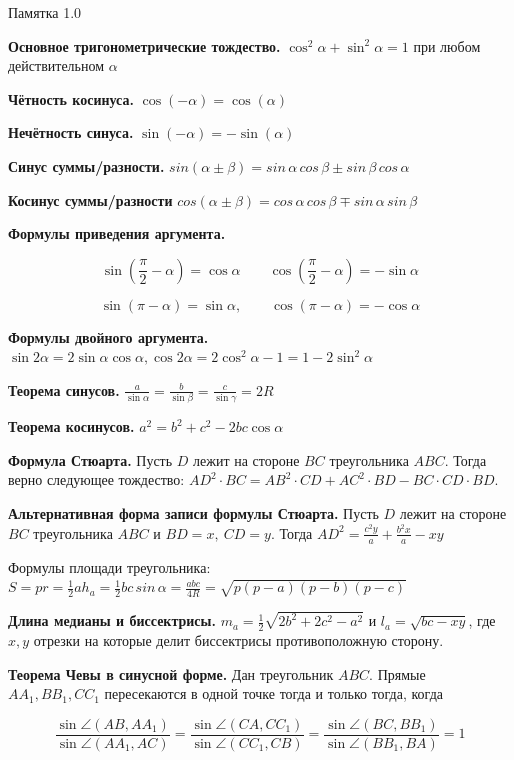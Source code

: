 \centerline{\Huge Памятка 1.0}
\centerline{\Huge }

\textbf{Основное тригонометрические тождество.} $\cos^2\alpha + \sin^2\alpha = 1$ при любом действительном $\alpha$

\textbf{Чётность косинуса.} $\cos(-\alpha) = \cos(\alpha)$

\textbf{Нечётность синуса.} $\sin (-\alpha) = - \sin(\alpha) $
 
\textbf{Синус суммы/разности.} $sin(\alpha \pm \beta) = sin \, \alpha \, cos \, \beta  \pm sin \, \beta \, cos \, \alpha $

\textbf{Косинус суммы/разности} $cos(\alpha \pm \beta) = cos \, \alpha \, cos \, \beta  \mp sin \, \alpha \, sin \, \beta $

\textbf{Формулы приведения аргумента.} 

$$
\sin(\frac{\pi}{2}- \alpha) = \cos \alpha \qquad \cos(\frac{\pi}{2} - \alpha) = -\sin\alpha
$$

$$
\sin(\pi - \alpha) = \sin\alpha, \qquad \cos(\pi - \alpha) = - \cos\alpha
$$

\textbf{Формулы двойного аргумента.} $\sin2\alpha = 2\sin\alpha \cos\alpha, \cos2\alpha = 2\cos^2\alpha - 1 = 1 - 2\sin^2\alpha$

\textbf{Теорема синусов.} $\frac{a}{\sin \alpha} = \frac{b}{\sin \beta} = \frac{c}{\sin \gamma} = 2R$

\textbf{Теорема косинусов.} $a^2 = b^2 + c^2 - 2bc  \cos  \alpha$

\textbf{Формула Стюарта.} Пусть $D$ лежит на стороне $BC$ треугольника $ABC$. Тогда верно следующее тождество: $AD^2 \cdot BC = AB^2 \cdot CD + AC^2 \cdot BD - BC \cdot CD \cdot BD.$ 

\textbf{Альтернативная форма записи формулы Стюарта.} Пусть $D$ лежит на стороне $BC$ треугольника $ABC$ и $BD = x,\ CD = y$. Тогда $AD^2 = \frac{c^2y}{a} + \frac{b^2x}{a} - xy$

Формулы площади треугольника: $S = pr = \frac{1}{2}ah_a = \frac{1}{2}bc \, sin \, \alpha = \frac{abc}{4R} = \sqrt{p(p-a)(p-b)(p-c)}$

\textbf{Длина медианы и биссектрисы.} $m_a = \frac{1}{2}\sqrt{2b^2 + 2c^2 - a^2}$ и $l_a = \sqrt{bc - xy}$, где $x, y$ отрезки на которые делит биссектрисы противоположную сторону.

\textbf{Теорема Чевы в синусной форме.} Дан треугольник $ABC$. Прямые $AA_1, BB_1, CC_1$ пересекаются в одной точке тогда и только тогда, когда

$$
	\frac{\sin \angle(AB, AA_1)}{\sin \angle(AA_1, AC)} = 
	\frac{\sin \angle(CA, CC_1)}{\sin \angle(CC_1, CB)} =
	\frac{\sin \angle(BC, BB_1)}{\sin \angle(BB_1, BA)} = 
	1
$$
